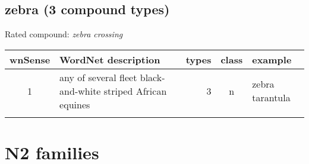 \subsection{zebra        (3 compound types)}
Rated compound: \emph{zebra crossing}

\vspace*{1ex}

\noindent
\begin{longtable}{c>{\raggedright\arraybackslash}p{5cm}rc>{\raggedright\arraybackslash}p{2cm}}\lsptoprule
{\small wnSense}&WordNet description&types&class&example\\\midrule
1&any of several fleet black-and-white striped African equines&3&n&zebra tarantula\\\lspbottomrule
\end{longtable}


\pagebreak[4]
\section{N2 families}
\label{sec:n2-WordNet-senses}



